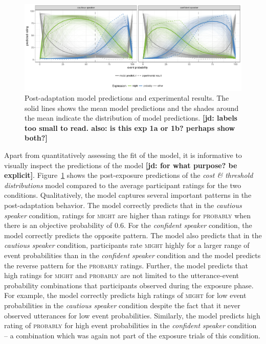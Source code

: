 \documentclass[lucida,biblatex]{sp} %
\newcommand{\jd}[1]{\textcolor{PinkyPurple}{\textbf{[jd: #1]}}}
\begin{document}
\begin{figure}
  \includegraphics[width=\textwidth]{plots/adaptation-posterior-predictions.pdf}
  \caption{Post-adaptation model predictions and experimental results. 
  The solid lines shows the mean model predictions and the shades around the mean indicate the distribution of model predictions. \label{fig:post-exposure-model} \jd{labels too small to read. also: is this exp 1a or 1b? perhaps show both?}}
\end{figure}

Apart from quantitatively assessing the fit of the model, it is informative to visually inspect the predictions of the model \jd{for what purpose? be explicit}. 
Figure~\ref{fig:post-exposure-model} shows the post-exposure predictions of the \textit{cost \& threshold distributions} model compared to the average participant ratings for the two conditions. Qualitatively, 
the model captures several important patterns in the post-adaptation behavior. The model correctly predicts that in the \textit{cautious speaker} condition, ratings for \textsc{might} are 
higher than ratings for \textsc{probably} when there is an objective probability of 0.6. For the \textit{confident speaker} condition, the model correctly predicts the
opposite pattern. The model also predicts that in the \textit{cautious speaker} condition, participants rate \textsc{might} highly for a larger range of event probabilities than
in the \textit{confident speaker} condition and the model predicts the  reverse pattern for the \textsc{probably} ratings. Further, the model predicts that high ratings for \textsc{might} 
and \textsc{probably} are not limited to the utterance-event probability combinations that participants observed during the exposure phase. For example, the model correctly predicts
high ratings of \textsc{might} for low event probabilities in the \textit{cautious speaker} condition despite the fact that it never observed utterances for low event probabilities. Similarly,
the model predicts high rating of \textsc{probably} for high event probabilities in the \textit{confident speaker} condition -- a combination which was again not part of the exposure trials
of this condition.
\end{document}
